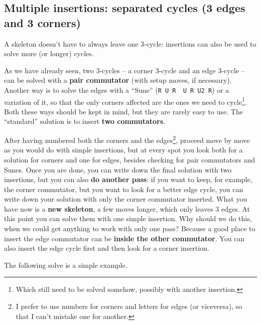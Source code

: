 \documentclass[11pt,a4paper]{book}
\newcommand{\p}{\textquotesingle}
\newcommand{\m}{\texttt}
\newcommand{\ps}{\p\,\,}
\begin{document}
\subsection{Multiple insertions: separated cycles (3 edges and 3 corners)}

A skeleton doesn't have to always leave one 3-cycle: insertions can also be used to solve more (or longer) cycles.

As we have already seen, two 3-cycles -- a corner 3-cycle and an edge 3-cycle -- can be solved with a \textbf{pair commutator} (with setup moves, if necessary). Another way is to solve the edges with a ``Sune'' (\m{R U R\ps U R U2 R\p}) or a variation of it, so that the only corners affected are the ones we need to cycle\footnote{Which still need to be solved somehow, possibly with another insertion.}. Both these ways should be kept in mind, but they are rarely easy to use. The ``standard'' solution is to insert \textbf{two commutators}.

After having numbered both the corners and the edges\footnote{I prefer to use numbers for corners and letters for edges (or viceversa), so that I can't mistake one for another.}, proceed move by move as you would do with simple insertions, but at every spot you look both for a solution for corners and one for edges, besides checking for pair commutators and Sunes. Once you are done, you can write down the final solution with two insertions, but you can also \textbf{do another pass}: if you want to keep, for example, the corner commutator, but you want to look for a better edge cycle, you can write down your solution with only the corner commutator inserted. What you have now is a \textbf{new skeleton}, a few moves longer, which only leaves 3 edges. At this point you can solve them with one simple insertion. Why should we do this, when we could get anything to work with only one pass? Because a good place to insert the edge commutator can be \textbf{inside the other commutator}. You can also insert the edge cycle first and then look for a corner insertion.

The following solve is a simple example.
\end{document}
